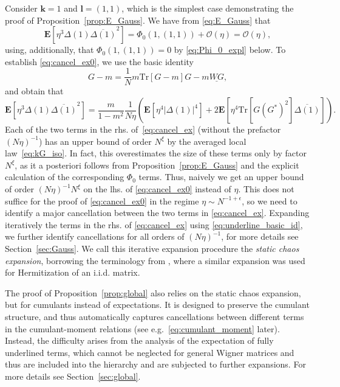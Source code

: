 \documentclass[10pt]{amsart}
\numberwithin{equation}{section}
\newcommand{\E}{\mathbf{E}}
\newcommand{\Tr}{\mathrm{Tr}}
\begin{document}
Consider $\bm{k}=1$ and $\bm{l}=(1,1)$, which is the simplest case demonstrating the proof of Proposition~\ref{prop:E_Gauss}. We have from \eqref{eq:E_Gauss} that
\begin{equation}
\E \left[ \eta^3 \Delta(1)\overline{\Delta(1)}^2\right] = \Phi_0(1,(1,1)) +\mathcal{O}(\eta)=\mathcal{O}(\eta),
\label{eq:cancel_ex0}
\end{equation}
using, additionally, that $\Phi_0(1,(1,1))=0$ by \eqref{eq:Phi_0_expl} below. To establish \eqref{eq:cancel_ex0}, we use the basic identity
\begin{equation}
G-m=\frac{1}{N}m\Tr[G-m]G - m\underline{WG},
\label{eq:underline_basic_id}
\end{equation}
and obtain that
\begin{equation}
\E \left[ \eta^3 \Delta(1)\overline{\Delta(1)}^2\right] =\frac{m}{1-m^2}\frac{1}{N\eta}\left( \E \left[ \eta^4 |\Delta(1)|^4\right] + 2\E \left[ \eta^4\Tr\left[G(G^*)^2\right] \overline{\Delta(1)}\right]\right).
\label{eq:cancel_ex}
\end{equation}
Each of the two terms in the rhs. of~\eqref{eq:cancel_ex} (without the prefactor $(N\eta)^{-1}$) has an upper bound of order $N^\xi$ by the averaged local law~\eqref{eq:kG_iso}. In fact, this overestimates the size of these terms only by factor $N^\xi$, as it a posteriori follows from Proposition~\ref{prop:E_Gauss} and the explicit calculation of the corresponding $\Phi_0$ terms. Thus, naively we get an upper bound of order $(N\eta)^{-1}N^\xi$ on the lhs. of \eqref{eq:cancel_ex0} instead of $\eta$. This does not suffice for the proof of \eqref{eq:cancel_ex0} in the regime $\eta\sim N^{-1+\epsilon}$, so we need to identify a major cancellation between the two terms in \eqref{eq:cancel_ex}. Expanding iteratively the terms in the rhs. of \eqref{eq:cancel_ex} using \eqref{eq:underline_basic_id}, we further identify cancellations for all orders of $(N\eta)^{-1}$, for more details see Section~\ref{sec:Gauss}. We call this iterative expansion procedure the \emph{static chaos expansion}, borrowing the terminology from \cite{hyperuniformity}, where a similar expansion was used for Hermitization of an i.i.d. matrix.

The proof of Proposition~\ref{prop:global} also relies on the static chaos expansion, but for cumulants instead of expectations. It is designed to preserve the cumulant structure, and thus automatically captures cancellations between different terms in the cumulant-moment relations (see e.g.~\eqref{eq:cumulant_moment} later). Instead, the difficulty arises from the analysis of the expectation of fully underlined terms, which cannot be neglected for general Wigner matrices and thus are included into the hierarchy and are subjected to further expansions. For more details see Section~\ref{sec:global}.  
\end{document}
